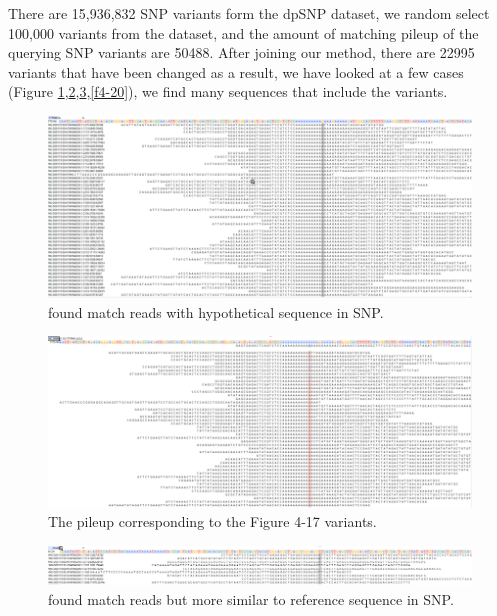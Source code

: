 There are 15,936,832 SNP variants form the dpSNP dataset, we random select 100,000 variants from the dataset, and the amount of matching pileup of the querying SNP variants are 50488. After joining our method, there are 22995 variants that have been changed as a result, we have looked at a few cases (Figure \ref{f4-17},\ref{f4-18},\ref{f4-19},\ref{f4-20}), we find many sequences that include the variants.

\vspace{0.5cm}
\begin{figure}[H]
    \centering
    \includegraphics[width=1\columnwidth]{body/image/4-17.png}
    \captionsetup{labelfont=bf}
    \renewcommand{\baselinestretch}{1.0}
    \vspace{-1cm}
    \caption[SNP match reads]{ found match reads with hypothetical sequence in SNP.}
    \label{f4-17}
\end{figure}

\vspace{0.5cm}
\begin{figure}[H]
    \centering
    \includegraphics[width=1\columnwidth]{body/image/4-18.png}
    \captionsetup{labelfont=bf}
    \renewcommand{\baselinestretch}{1.0}
    \vspace{-1cm}
    \caption[Figure 4.17 pileup]{ The pileup corresponding to the Figure 4-17 variants.}
    \label{f4-18}
\end{figure}

\begin{figure}[H]
    \centering
    \includegraphics[width=1\columnwidth]{body/image/4-19.png}
    \captionsetup{labelfont=bf}
    \renewcommand{\baselinestretch}{1.0}
    \vspace{-1cm}
    \caption[SNP worse match reads]{ found match reads but more similar to reference sequence in SNP.}
    \label{f4-19}
\end{figure}

